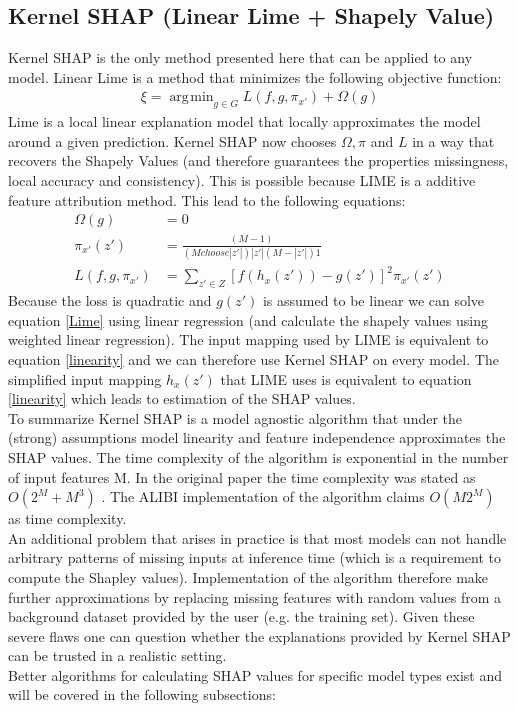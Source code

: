 \documentclass[conference]{IEEEtran}
\DeclareMathOperator*{\argmin}{\arg\!\min}
\begin{document}
\subsection{Kernel SHAP (Linear Lime + Shapely Value)}
Kernel SHAP \cite{b2} is the only method presented here that can be applied to any model.
Linear Lime is a method that minimizes the following objective function:
\begin{align}
\xi = \argmin_{g \in G} L(f,g,\pi_{x'}) + \Omega(g) \label{Lime}
\end{align}
Lime is a local linear explanation model that locally approximates the model around a given prediction.
Kernel SHAP now chooses $\Omega, \pi$ and $L$ in a way that recovers the Shapely Values (and therefore guarantees the properties missingness, local accuracy and consistency). This is possible because LIME is a additive feature attribution method. This lead to the following equations:
\begin{align}
\Omega(g) &= 0\\
\pi_{x'}(z') &= \frac{(M - 1)}{(M choose |z'|)|z'|(M - |z'|)1}\\
L(f,g,\pi_{x'}) &= \sum_{z' \in Z}[f(h_x(z')) - g(z')]^2 \pi_{x'}(z')
\end{align}
Because the loss is quadratic and $g(z')$ is assumed to be linear we can solve equation \ref{Lime} using linear regression (and calculate the shapely values using weighted linear regression). 
The input mapping used by LIME is equivalent to equation \ref{linearity} and we can therefore use Kernel SHAP on every model.
The simplified input mapping $h_x(z')$ that LIME uses is equivalent to equation \ref{linearity} which leads to estimation of the SHAP values.\\
To summarize Kernel SHAP is a model agnostic algorithm that under the (strong) assumptions model linearity and feature independence approximates the SHAP values. The time complexity of the algorithm is exponential in the number of input features M. In the original paper the time complexity was stated as $O(2^M + M^3)$ \cite{b2}. The ALIBI implementation of the algorithm claims $O(M2^M)$ as time complexity. \cite{b9}\\
An additional problem that arises in practice is that most models can not handle arbitrary patterns of missing inputs at inference time (which is a requirement to compute the Shapley values).
Implementation of the algorithm therefore make further approximations by replacing missing features with random values from a background dataset provided by the user (e.g. the training set). 
Given these severe flaws one can question whether the explanations provided by Kernel SHAP can be trusted in a realistic setting.\\
Better algorithms for calculating SHAP values for specific model types exist and will be covered in the following subsections:\\
\end{document}
